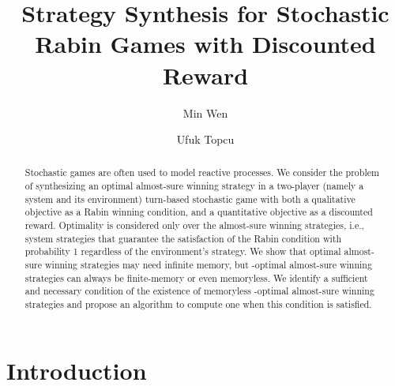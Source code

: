 \documentclass[runningheads,a4paper]{llncs}
\begin{document}
\mainmatter  

\title{Strategy Synthesis for Stochastic Rabin Games with Discounted Reward}


\author{Min Wen\and Ufuk Topcu}





\maketitle


\begin{abstract}


Stochastic games are often used to model reactive processes. We consider the problem of synthesizing an optimal almost-sure winning strategy in a two-player (namely a system and its environment) turn-based stochastic game with both a qualitative objective as a Rabin winning condition, and a quantitative objective as a discounted reward. Optimality is considered only over the almost-sure winning strategies, i.e., system strategies that guarantee the satisfaction of the Rabin condition with probability 1 regardless of the environment's strategy. We show that optimal almost-sure winning strategies may need infinite memory, but -optimal almost-sure winning strategies can always be finite-memory or even memoryless. We identify a sufficient and necessary condition of the existence of memoryless -optimal almost-sure winning strategies and propose an algorithm to compute one when this condition is satisfied. 





\end{abstract}

\section{Introduction}
\end{document}
